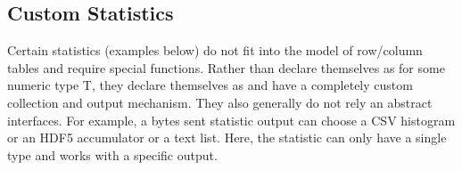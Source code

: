 \subsection{Custom Statistics}\label{subsec:customStats}
Certain statistics (examples below) do not fit into the model of row/column tables and require special  functions.
Rather than declare themselves as  for some numeric type T, they declare themselves as  and have a completely custom collection and output mechanism.
They also generally do not rely an abstract interfaces. 
For example, a bytes sent statistic output can choose a CSV histogram or an HDF5 accumulator or a text list.
Here, the statistic can only have a single type and works with a specific output.
